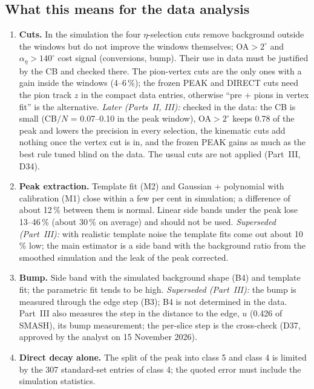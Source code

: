 \subsection{What this means for the data analysis}
\label{sec:s5data}
\begin{enumerate}
\item \textbf{Cuts.} In the simulation the four $\eta$-selection cuts remove background outside the
      windows but do not improve the windows themselves; OA$>2^\circ$ and $\alpha_\eta>140^\circ$ cost
      signal (conversions, bump). Their use in data must be justified by the CB and checked there.
      The pion-vertex cuts are the only ones with a gain inside the windows (4--6\,\%); the frozen
      PEAK and DIRECT cuts need the pion track $z$ in the compact data entries, otherwise ``pre + pions
      in vertex fit'' is the alternative. \emph{Later (Parts~II, III):} checked in the data: the CB is small
      (CB$/N$ = 0.07--0.10 in the peak window), OA$>2^\circ$ keeps 0.78 of the peak and lowers the precision in every
      selection, the kinematic cuts add nothing once the vertex cut is in, and the frozen PEAK gains as much as the best
      rule tuned blind on the data. The usual cuts are not applied (Part~III, D34).
\item \textbf{Peak extraction.} Template fit (M2) and Gaussian + polynomial with calibration (M1)
      close within a few per cent in simulation; a difference of about 12\,\% between them is normal.
      Linear side bands under the peak lose 13--46\,\% (about 30\,\% on average) and should not be used.
      \emph{Superseded (Part~III):} with realistic template noise the template fits come out about 10\,\% low; the main
      estimator is a side band with the background ratio from the smoothed simulation and the leak of the peak corrected.
\item \textbf{Bump.} Side band with the simulated background shape (B4) and template fit; the
      parametric fit tends to be high. \emph{Superseded (Part~III):} the bump is measured through the edge step (B3);
      B4 is not determined in the data. Part~III also measures the step in the distance to the edge, $u$ (0.426 of
      SMASH), its bump measurement; the per-slice step is the cross-check (D37, approved by the analyst on 15 November 2026).
\item \textbf{Direct decay alone.} The split of the peak into class 5 and class 4 is limited by the
      307 standard-set entries of class 4; the quoted error must include the simulation statistics.

\end{enumerate}
